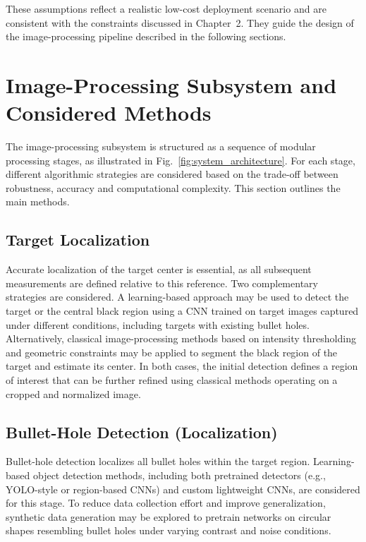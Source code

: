 These assumptions reflect a realistic low-cost deployment scenario and are consistent with the
constraints discussed in Chapter~2. They guide the design of the image-processing pipeline
described in the following sections.

\section{Image-Processing Subsystem and Considered Methods}
\label{sec:ip_methods}

The image-processing subsystem is structured as a sequence of modular processing stages, as
illustrated in Fig.~\ref{fig:system_architecture}. For each stage, different algorithmic strategies
are considered based on the trade-off between robustness, accuracy and computational
complexity. This section outlines the main methods.

\subsection*{Target Localization}

Accurate localization of the target center is essential, as all subsequent measurements are
defined relative to this reference. Two complementary strategies are considered. A learning-based
approach may be used to detect the target or the central black region using a CNN
trained on target images captured under different conditions, including targets
with existing bullet holes. Alternatively, classical image-processing methods based on intensity
thresholding and geometric constraints may be applied to segment the black region of the target
and estimate its center. In both cases, the initial detection defines a region of interest that can
be further refined using classical methods operating on a cropped and normalized image.

\subsection*{Bullet-Hole Detection (Localization)}

Bullet-hole detection localizes all bullet holes within the target region.
Learning-based object detection methods, including both
pretrained detectors (e.g., YOLO-style or region-based CNNs) and custom lightweight CNNs,
are considered for this stage. To reduce data collection effort and improve
generalization, synthetic data generation may be explored to pretrain networks on circular
shapes resembling bullet holes under varying contrast and noise conditions.

